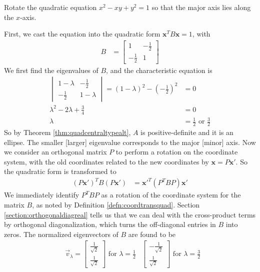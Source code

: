 \begin{exmp}
Rotate the quadratic equation $x^2 - xy + y^2 = 1$ so that the major axis lies along the $x$-axis.
\label{exmp:quadgraphrotate}
\end{exmp}
First, we cast the equation into the quadratic form $\textbf{x}^T B\textbf{x} = 1$, with
\begin{align*}
B &=
\begin{bmatrix}
1 & -\frac{1}{2} \\
-\frac{1}{2} & 1
\end{bmatrix}
\end{align*}
We first find the eigenvalues of $B$, and the characteristic equation is
\begin{align*}
\begin{vmatrix}
1-\lambda & -\frac{1}{2} \\
-\frac{1}{2} & 1-\lambda
\end{vmatrix} = (1-\lambda)^2 - (-\frac{1}{2})^2 &= 0 \\
\lambda^2 - 2\lambda + \frac{3}{4} &= 0 \\
\lambda &= \frac{1}{2} \text{ or } \frac{3}{2}
\end{align*}
So by Theorem \ref{thm:quadcentraltypealt}, $A$ is positive-definite and it is an ellipse. The smaller [larger] eigenvalue corresponds to the major [minor] axis. Now we consider an orthogonal matrix $P$ to perform a rotation on the coordinate system, with the old coordinates related to the new coordinates by $\textbf{x} = P\textbf{x}'$. So the quadratic form is transformed to
\begin{align*}
(P\textbf{x}')^T B (P\textbf{x}') &= \textbf{x}'^T (P^T BP) \textbf{x}'
\end{align*}
We immediately identify $P^T BP$ as a rotation of the coordinate system for the matrix $B$, as noted by Definition \ref{defn:coordtransquad}. Section \ref{section:orthogonaldiagreal} tells us that we can deal with the cross-product terms by orthogonal diagonalization, which turns the off-diagonal entries in $B$ into zeros. The normalized eigenvectors of $B$ are found to be
\begin{align*}
&\vec{v}_\lambda = \begin{bmatrix}
\frac{1}{\sqrt{2}} \\
\frac{1}{\sqrt{2}}
\end{bmatrix}
\text{ for } \lambda = \frac{1}{2}
& \begin{bmatrix}
-\frac{1}{\sqrt{2}} \\
\frac{1}{\sqrt{2}}
\end{bmatrix}
\text{ for } \lambda = \frac{3}{2}
\end{align*}
